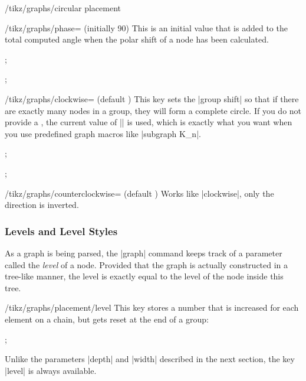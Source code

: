 \begin{key}{/tikz/graphs/circular placement}
    \begin{key}{/tikz/graphs/phase= (initially 90)}
        This is an initial value that is added to the total computed angle when
        the polar shift of a node has been calculated.
\begin{codeexample}[]
\tikz {};
\end{codeexample}
\begin{codeexample}[]
\tikz {};
\end{codeexample}
    \end{key}
\end{key}

\label{key-graphs-clockwise}%
\begin{key}{/tikz/graphs/clockwise= (default \string\tikzgraphVnum)}
    This key sets the |group shift| so that if there are exactly 
    many nodes in a group, they will form a complete circle. If you do not
    provide a , the current value of |\tikzgraphVnum| is used,
    which is exactly what you want when you use predefined graph macros like
    |subgraph K_n|.
\begin{codeexample}[]
\tikz {};
\end{codeexample}
\begin{codeexample}[]
\tikz {};
\end{codeexample}
\end{key}

\label{key-graphs-counterclockwise}%
\begin{key}{/tikz/graphs/counterclockwise= (default \string\tikzgraphVnum)}
    Works like |clockwise|, only the direction is inverted.
\end{key}


\subsubsection{Levels and Level Styles}

As a graph is being parsed, the |graph| command keeps track of a parameter
called the \emph{level} of a node. Provided that the graph is actually
constructed in a tree-like manner, the level is exactly equal to the level of
the node inside this tree.

\begin{key}{/tikz/graphs/placement/level}
    This key stores a number that is increased for each element on a chain, but
    gets reset at the end of a group:
\begin{codeexample}[]
\tikz {};
\end{codeexample}
    Unlike the parameters |depth| and |width| described in the next section,
    the key |level| is always available.
\end{key}

